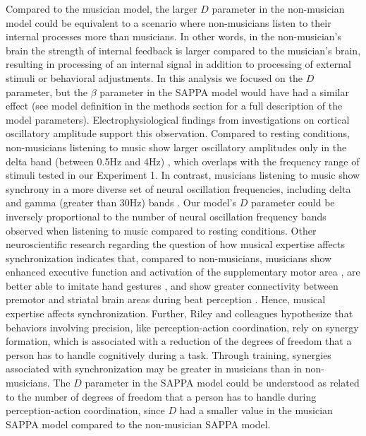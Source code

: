 \documentclass{report}
\begin{document}
Compared to the musician model, the larger $D$ parameter in the non-musician model could be equivalent to a scenario where non-musicians listen to their internal processes more than musicians. In other words, in the non-musician's brain the strength of internal feedback is larger compared to the musician's brain, resulting in processing of an internal signal in addition to processing of external stimuli or behavioral adjustments. In this analysis we focused on the $D$ parameter, but the $\beta$ parameter in the SAPPA model would have had a similar effect (see model definition in the methods section for a full description of the model parameters). Electrophysiological findings from investigations on cortical oscillatory amplitude support this observation. Compared to resting conditions, non-musicians listening to music show larger oscillatory amplitudes only in the delta band (between 0.5Hz and 4Hz) \cite{bhattacharya2005phase}, which overlaps with the frequency range of stimuli tested in our Experiment 1. In contrast, musicians listening to music show synchrony in a more diverse set of neural oscillation frequencies, including delta and gamma (greater than 30Hz) bands \cite{bhattacharya2005phase}. Our model's $D$ parameter could be inversely proportional to the number of neural oscillation frequency bands observed when listening to music compared to resting conditions. Other neuroscientific research regarding the question of how musical expertise affects synchronization indicates that, compared to non-musicians, musicians show enhanced executive function and activation of the supplementary motor area \cite{zuk2014behavioral}, are better able to imitate hand gestures \cite{spilka2010gesture}, and show greater connectivity between premotor and striatal brain areas during beat perception \cite{grahn2009feeling}. Hence, musical expertise affects synchronization. Further, Riley and colleagues \cite{riley2012learning} hypothesize that behaviors involving precision, like perception-action coordination, rely on synergy formation, which is associated with a reduction of the degrees of freedom that a person has to handle cognitively during a task. Through training, synergies associated with synchronization may be greater in musicians than in non-musicians. The $D$ parameter in the SAPPA model could be understood as related to the number of degrees of freedom that a person has to handle during perception-action coordination, since $D$ had a smaller value in the musician SAPPA model compared to the non-musician SAPPA model.
\end{document}
